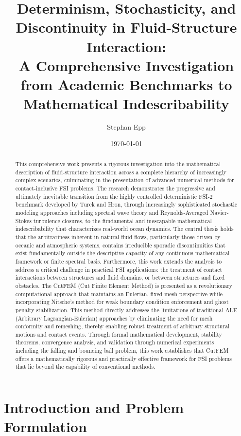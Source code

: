 ﻿\documentclass[a4paper,11pt]{article}
\title{\textbf{Determinism, Stochasticity, and Discontinuity in Fluid-Structure Interaction: \\A Comprehensive Investigation from Academic Benchmarks to Mathematical Indescribability}}
\author{Stephan Epp}
\date{\today}
\theoremstyle{definition}
\begin{document}
\maketitle

\begin{abstract}
This comprehensive work presents a rigorous investigation into the mathematical description of fluid-structure interaction across a complete hierarchy of increasingly complex scenarios, culminating in the presentation of advanced numerical methods for contact-inclusive FSI problems. The research demonstrates the progressive and ultimately inevitable transition from the highly controlled deterministic FSI-2 benchmark developed by Turek and Hron, through increasingly sophisticated stochastic modeling approaches including spectral wave theory and Reynolds-Averaged Navier-Stokes turbulence closures, to the fundamental and inescapable mathematical indescribability that characterizes real-world ocean dynamics. The central thesis holds that the arbitrariness inherent in natural fluid flows, particularly those driven by oceanic and atmospheric systems, contains irreducible sporadic discontinuities that exist fundamentally outside the descriptive capacity of any continuous mathematical framework or finite spectral basis. Furthermore, this work extends the analysis to address a critical challenge in practical FSI applications: the treatment of contact interactions between structures and fluid domains, or between structures and fixed obstacles. The CutFEM (Cut Finite Element Method) is presented as a revolutionary computational approach that maintains an Eulerian, fixed-mesh perspective while incorporating Nitsche's method for weak boundary condition enforcement and ghost penalty stabilization. This method directly addresses the limitations of traditional ALE (Arbitrary Lagrangian-Eulerian) approaches by eliminating the need for mesh conformity and remeshing, thereby enabling robust treatment of arbitrary structural motions and contact events. Through formal mathematical development, stability theorems, convergence analysis, and validation through numerical experiments including the falling and bouncing ball problem, this work establishes that CutFEM offers a mathematically rigorous and practically effective framework for FSI problems that lie beyond the capability of conventional methods.
\end{abstract}

\tableofcontents
\newpage

\section{Introduction and Problem Formulation}
\end{document}
